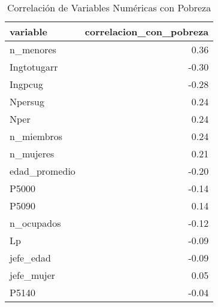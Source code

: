 \begin{table}[ht]
\centering
\begin{tabular}{lr}
  \toprule
variable & correlacion\_con\_pobreza \\ 
  \midrule
n\_menores & 0.36 \\ 
  Ingtotugarr & -0.30 \\ 
  Ingpcug & -0.28 \\ 
  Npersug & 0.24 \\ 
  Nper & 0.24 \\ 
  n\_miembros & 0.24 \\ 
  n\_mujeres & 0.21 \\ 
  edad\_promedio & -0.20 \\ 
  P5000 & -0.14 \\ 
  P5090 & 0.14 \\ 
  n\_ocupados & -0.12 \\ 
  Lp & -0.09 \\ 
  jefe\_edad & -0.09 \\ 
  jefe\_mujer & 0.05 \\ 
  P5140 & -0.04 \\ 
   \bottomrule
\end{tabular}
\caption{Correlación de Variables Numéricas con Pobreza} 
\label{tab:poverty_correlation}
\end{table}
